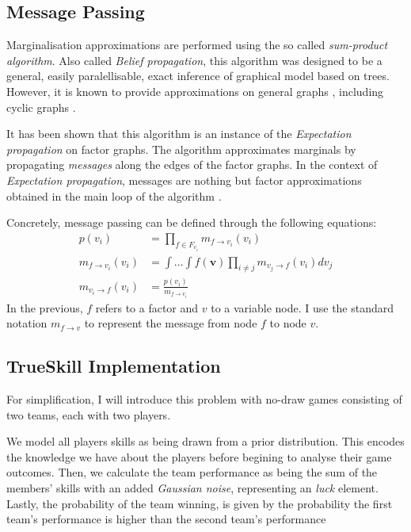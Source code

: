 \documentclass[10pt,a4]{article}
\begin{document}
\subsection{Message Passing}

Marginalisation approximations are performed using the so called \emph{sum-product algorithm}. 
Also called \emph{Belief propagation}\cite{pearl1982reverend}, this algorithm was designed
to be a general, easily paralellisable, exact inference of graphical model
based on trees. However, it is known to provide approximations on general graphs
\cite{pearl2014probabilistic}, including cyclic graphs \cite{murphy1999loopy}.

It has been shown that this algorithm is an instance of the 
\emph{Expectation propagation}\cite{minka2001expectation} on factor graphs. 
The algorithm approximates marginals by propagating \emph{messages} along the 
edges of the factor graphs. In the context of \emph{Expectation propagation}, 
messages are nothing but factor approximations obtained in the main loop of the 
algorithm \cite{minka2001expectation}.

Concretely, message passing can be defined through the following equations:
\begin{align*}
	p(v_i) &= \prod_{f \in {F_{v_i}}}m_{f \to v_i}(v_i)  \\
	m_{f \to v_i}(v_i) &= \int...\int f(\textbf{v}) \prod_{i \neq j}m_{v_j \to f}(v_i)dv_j \\
	m_{v_i \to f}(v_i) &= \frac{p(v_i)}{m_{f \to v_i}} 
\end{align*}
In the previous, $f$ refers to a factor and $v$ to a variable node. I use the 
standard notation $m_{f \to v}$ to represent the message from node $f$ to node $v$.

\subsection{TrueSkill Implementation}

For simplification, I will introduce this problem with no-draw games consisting 
of two teams, each with two players. 

We model all players skills as being drawn from a prior distribution. This encodes
the knowledge we have about the players before begining to analyse their game 
outcomes. Then, we calculate the team performance as being the sum of the 
members' skills with an added \emph{Gaussian noise}, representing an \emph{luck}
element. Lastly, the probability of the team winning, is given by the probability 
the first team's performance is higher than the second team's performance
\end{document}
